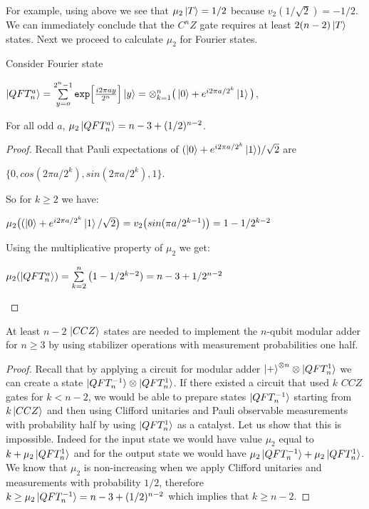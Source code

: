 \documentclass[12pt]{dalthesis}
\begin{document}
For example, using above we see that $\mu_2\ket{T} = 1/2$ because $v_2(1/\sqrt{2}) = -1/2$. We can immediately conclude that the $C^nZ$ gate requires at least $2(n-2)\ket{T}$ states. Next we proceed to calculate $\mu_2$ for Fourier states.

\begin{proposition}
Consider Fourier state
\begin{center}
$\ket{QFT_n^a} = \sum\limits_{y=o}^{2^n-1} \texttt{exp}\Big[ \frac{i2\pi ay}{2^n} \Big] \ket{y} = \otimes_{k=1}^n \big( \ket{0} + e^{i2\pi a/2^k}\ket{1}\big)$,
\end{center}
For all odd $a$, $\mu_2\ket{QFT_n^a} = n-3 +(1/2)^{n-2}$.
\end{proposition}
\begin{proof}
Recall that Pauli expectations of $(\ket{0} + e^{i2\pi a/2^k}\ket{1})/\sqrt{2}$ are
\begin{center}
$\{ 0, cos(2\pi a/2^k), sin(2\pi a/2^k), 1 \}$.
\end{center}
So for $k \geq 2$ we have:
\begin{center}
$\mu_2 \big( (\ket{0} + e^{i2\pi a/2^k} \ket{1}/\sqrt{2} \big) = v_2 \big( sin(\pi a/2^{k-1}) \big) = 1 - 1/2^{k-2}$
\end{center}
Using the multiplicative property of $\mu_2$ we get:
\begin{center}
$\mu_2 (\ket{QFT_n^a}) = \sum\limits_{k=2}^n \big( 1-1/2^{k-2}) = n-3 + 1/2^{n-2}$
\end{center}
\end{proof}

\begin{lemma}
At least $n-2$ $\ket{CCZ}$ states are needed to implement the $n$-qubit modular adder for $n \geq 3$ by using stabilizer operations with measurement probabilities one half.
\end{lemma}
\begin{proof}
Recall that by applying a circuit for modular adder $\ket{+}^{\otimes n} \otimes \ket{QFT_n^1}$ we can create a state $\ket{QFT_n^{-1}} \otimes \ket{QFT_n^1}$. If there existed a circuit that used $k$ $CCZ$ gates for $k < n-2$, we would be able to prepare states $\ket{QFT_n^{-1}}$ starting from $k \ket{CCZ}$ and then using Clifford unitaries and Pauli observable measurements with probability half by using $\ket{QFT_n^1}$ as a catalyst. Let us show that this is impossible. Indeed for the input state we would have value $\mu_2$ equal to $k + \mu_2 \ket{QFT_n^1}$ and for the output state we would have $\mu_2 \ket{QFT_n^{-1}} + \mu_2 \ket{QFT_n^1}$. We know that $\mu_2$ is non-increasing when we apply Clifford unitaries and measurements with probability $1/2$, therefore $k \geq \mu_2 \ket{QFT_n^{-1}} = n - 3 +(1/2)^{n-2}$ which implies that $k \geq n-2$.
\end{proof}
\end{document}
